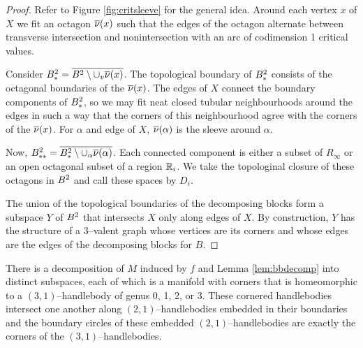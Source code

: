 \begin{proof}
	Refer to Figure \ref{fig:critsleeve} for the general idea.	
	Around each vertex $x$ of $X$ we fit an octagon $\overline{\nu}(x)$ such that the edges of the octagon alternate between transverse intersection and nonintersection with an arc of codimension 1 critical values.
	
	Consider $B^2_*=\overline{B^2\setminus\cup_v \overline{\nu}(x)}$.
	The topological boundary of $B^2_*$ consists of the octagonal boundaries of the $\overline{\nu}(x)$.
	The edges of $X$ connect the boundary components of $B^2_*$, so we may fit neat closed tubular neighbourhoods around the edges in such a way that the corners of this neighbourhood agree with the corners of the $\overline{\nu}(x)$.
	For $\alpha$ and edge of $X$, $\overline{\nu}(\alpha)$ is the sleeve around $\alpha$.
	
	Now, $B^2_{**}=\overline{B^2_*\setminus\cup_\alpha\overline{\nu}(\alpha)}$.
	Each connected component is either a subset of $R_\infty$ or an open octagonal subset of a region $\mathbb{R}_i$.
	We take the topologinal closure of these octagons in $B^2$ and call these spaces by $D_i$.
	
	The union of the topological boundaries of the decomposing blocks form a subspace $Y$ of $B^2$ that intersects $X$ only along edges of $X$.
	By construction, $Y$ has the structure of a 3--valent graph whose vertices are its corners and whose edges are the edges of the decomposing blocks for $B$.
\end{proof}

\begin{lem}
	\label{lem:3bodydecomp}
	There is a decomposition of $M$ induced by $f$ and Lemma \ref{lem:bbdecomp} into distinct subspaces, each of which is a manifold with corners that is homeomorphic to a $(3,1)$--handlebody of genus 0, 1, 2, or 3.
	These cornered handlebodies intersect one another along $(2,1)$--handlebodies embedded in their boundaries and the boundary circles of these embedded $(2,1)$--handlebodies are exactly the corners of the $(3,1)$--handlebodies.
\end{lem}

